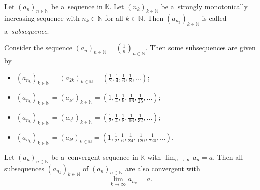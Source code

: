 

\begin{Definition}[Subsequence]
Let $(a_n)_{n\in\mathbb{N}}$ be a~sequence in $\mathbb{K}$. Let $(n_k)_{k\in\mathbb{N}}$ be a~strongly monotonically increasing sequence with $n_k\in\mathbb{N}$ for all $k\in\mathbb{N}$. Then
$(a_{n_k})_{k\in\mathbb{N}}$ is called a~{\em subsequence}.
\end{Definition}


\begin{example}
Consider the sequence $(a_n)_{n\in\mathbb{N}}=(\frac1n)_{n\in\mathbb{N}}$. Then some subsequences are given by
\begin{itemize}
 \item $(a_{n_k})_{k\in\mathbb{N}}=(a_{2k})_{k\in\mathbb{N}}=(\frac12,\frac14,\frac16,\frac18,\ldots)$;
 \item $(a_{n_k})_{k\in\mathbb{N}}=(a_{k^2})_{k\in\mathbb{N}}=(1,\frac14,\frac19,\frac1{16},\frac1{25},\ldots)$;
 \item $(a_{n_k})_{k\in\mathbb{N}}=(a_{2^k})_{k\in\mathbb{N}}=(\frac12,\frac14,\frac18,\frac1{16},\frac1{32},\ldots)$;
 \item $(a_{n_k})_{k\in\mathbb{N}}=(a_{k!})_{k\in\mathbb{N}}=(1,\frac12,\frac16,\frac1{24},\frac1{120},\frac1{720},\ldots)$.
\end{itemize}
\end{example}

\begin{Theorem}\label{thm:convsubseq}
Let $(a_n)_{n\in\mathbb{N}}$ be a~convergent sequence in $\mathbb{K}$ with $\lim_{n\to\infty}a_n=a$. Then all subsequences $(a_{n_k})_{k\in\mathbb{N}}$ of $(a_n)_{n\in\mathbb{N}}$ are also convergent with
\[\lim_{k\to\infty}a_{n_k}=a.\]
\end{Theorem}

